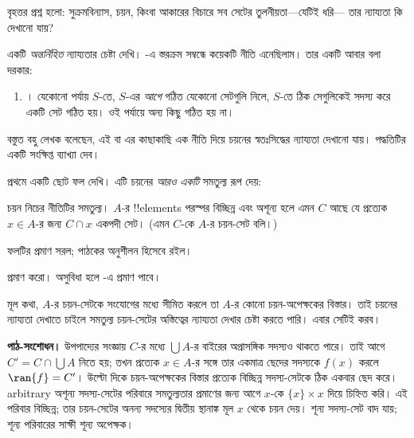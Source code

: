\documentclass[../../../include/open-logic-section]{subfiles}
\begin{document}

বৃহত্তর প্রশ্ন হলো: সুক্রমবিন্যাস, চয়ন, কিংবা
আকারের বিচারে সব সেটের তুলনীয়তা—যেটিই ধরি—
তার ন্যায্যতা কি দেখানো যায়?

একটি \emph{অন্তর্নিহিত} ন্যায্যতার চেষ্টা দেখি।
-এ স্তরক্রম সম্বন্ধে
কয়েকটি নীতি এনেছিলাম। তার একটি আবার বলা দরকার:
\begin{enumerate}
	\item[] \stagesacc। যেকোনো পর্যায় $S$-তে,
	$S$-এর \emph{আগে} গঠিত যেকোনো সেটগুলি
	নিলে, $S$-তে ঠিক সেগুলিকেই সদস্য করে একটি
	সেট গঠিত হয়। ওই পর্যায়ে অন্য কিছু গঠিত হয় না।
\end{enumerate}
বস্তুত বহু লেখক বলেছেন, এই বা এর কাছাকাছি
এক নীতি দিয়ে চয়নের স্বতঃসিদ্ধের ন্যায্যতা
দেখানো যায়। পদ্ধতিটির একটি সংক্ষিপ্ত ব্যাখ্যা দেব।

প্রথমে একটি ছোট ফল দেখি। এটি চয়নের \emph{আরও
একটি} সমতুল্য রূপ দেয়:

\begin{thm}[$\ZF$-এ]
চয়ন নিচের নীতিটির সমতুল্য। $A$-র !!{element}s
পরস্পর বিচ্ছিন্ন এবং অশূন্য হলে এমন $C$ আছে
যে প্রত্যেক $x\in A$-র জন্য $C\cap x$
একপদী সেট। (এমন $C$-কে $A$-র
{চয়ন-সেট} বলি।)
\end{thm}

ফলটির প্রমাণ সরল; পাঠকের অনুশীলন হিসেবে রইল।

\begin{prob}
প্রমাণ করো। অসুবিধা হলে
\cite[pp.~242--3]{Potter2004}-এ প্রমাণ পাবে।
\end{prob}

মূল কথা, $A$-র চয়ন-সেটকে সংযোগের মধ্যে সীমিত করলে
তা $A$-র কোনো চয়ন-অপেক্ষকের বিস্তার। তাই চয়নের ন্যায্যতা
দেখাতে চাইলে সমতুল্য চয়ন-সেটের অস্তিত্বের
ন্যায্যতা দেখার চেষ্টা করতে পারি। এবার সেটিই করব।
\par\noindent\textbf{পাঠ-সংশোধন।} উপপাদ্যের সংজ্ঞায় $C$-র মধ্যে $\bigcup A$-র বাইরের
অপ্রাসঙ্গিক সদস্যও থাকতে পারে। তাই আগে
$C'=C\cap\bigcup A$ নিতে হয়; তখন প্রত্যেক $x\in A$-র
সঙ্গে তার একমাত্র ছেদের সদস্যকে $f(x)$ করলে
$\ran{f}=C'$। উল্টো দিকে চয়ন-অপেক্ষকের বিস্তার প্রত্যেক
বিচ্ছিন্ন সদস্য-সেটকে ঠিক একবার ছেদ করে। arbitrary অশূন্য
সদস্য-সেটের পরিবারে সমতুল্যতার প্রমাণের জন্য আগে
$x$-কে $\{x\}\times x$ দিয়ে চিহ্নিত করি। এই পরিবার
বিচ্ছিন্ন; তার চয়ন-সেটের অনন্য সদস্যের দ্বিতীয় স্থানাঙ্ক
মূল $x$ থেকে চয়ন দেয়। শূন্য সদস্য-সেট বাদ যায়; শূন্য
পরিবারের সাক্ষী শূন্য অপেক্ষক।
\end{document}
